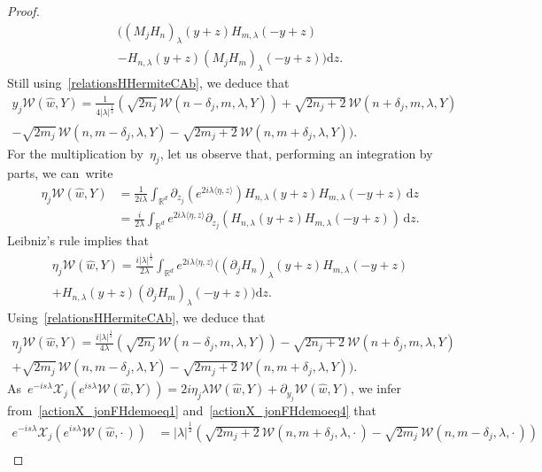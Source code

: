 \documentclass[11pt]{article}
\theoremstyle{definition}
\numberwithin{equation}{section}
\numberwithin{figure}{section}
\numberwithin{table}{section}
\newcommand{\lam}{\lambda}
\newcommand{\wh}{\widehat}
\newcommand*\cW{\mathcal{W}}
\newcommand*\cX{\mathcal{X}}
\newcommand*\R{\mathbb{R}}
\newcommand*{\dd}{\mathrm{d}}
\newcommand{\dz}{\dd z}
\renewcommand*{\cdotp}{.}
\begin{document}
\begin{proof}
\begin{multline*}
\Big((M_jH_n)_\lam (y+z) H_{m,\lam}(-y+z)\\
- H_{n,\lam}(y+z) (M_jH_m)_\lam(-y+z)\Big)\dz.
\end{multline*}
Still using~\eqref{relationsHHermiteCAb}, we deduce that
\begin{multline}\label{actionX_jonFHdemoeq3}
\!\! y_j \cW(\wh w,Y) = \frac 1 {4|\lam|^{\frac 12} } \left(\sqrt {2n_j} \,\cW(n\!-\!\delta_j,m,\lam,Y) \right)\!+\!\sqrt {2n_j\!+\!2}\,\cW(n\!+\!\delta_j,m,\lam,Y) \\
-\sqrt {2m_j}\,\cW(n,m-\delta_j,\lam,Y) -\sqrt {2m_j+2}\,\cW(n,m+\delta_j,\lam,Y)).\!\!
\end{multline}
For the multiplication by~$\eta_j$, let us observe that, performing an integration by parts, we can~write
\[
\begin{aligned}
\eta_j\cW(\wh w,Y) & = \frac 1 {2i\lam} \int_{\R^d} \partial_{z_j} \left(e^{2i\lam\langle \eta,z\rangle} \right) H_{n,\lam} (y+z) H_{m,\lam}(-y+z)\, \dz\\
& = \frac i {2\lam} \int_{\R^d} e^{2i\lam\langle \eta,z\rangle}\partial_{z_j} \left(H_{n,\lam} (y+z) H_{m,\lam}(-y+z) \right)\,\dz.
\end{aligned}
\]
Leibniz's rule implies that
\begin{multline*}
\eta_j\cW(\wh w,Y) = \frac {i|\lam|^{\frac 12}} {2\lam} \int_{\R^d} e^{2i\lam\langle \eta,z\rangle} \Big((\partial_jH_{n})_\lam (y+z) H_{m,\lam}(-y+z) \\
+ H_{n,\lam} (y+z) (\partial_j H_m)_\lam (-y+z) \Big)\dz.
\end{multline*}
Using~\eqref{relationsHHermiteCAb}, we deduce that
\begin{multline}\label{actionX_jonFHdemoeq4}
\!\!\eta_j \cW(\wh w,Y) = \frac {i |\lam|^{\frac 12} } {4\lam} (\sqrt {2n_j} \,\cW(n\!-\!\delta_j,m,\lam,Y)) -\sqrt {2n_j\!+\!2}\, \cW(n\!+\!\delta_j,m,\lam,Y) \\
+\sqrt {2m_j}\,\cW(n,m-\delta_j,\lam,Y) -\sqrt {2m_j+2}\,\cW(n,m+\delta_j,\lam,Y))\cdotp\!\!
\end{multline}
As~$e^{-is\lam} \cX_j\left(e^{is\lam}\cW(\wh w,Y) \right) = 2i\eta_j \lam\cW(\wh w,Y) +\partial_{y_j} \cW(\wh w,Y)$, we infer from~\eqref{actionX_jonFHdemoeq1} and~\eqref{actionX_jonFHdemoeq4} that
\[
\begin{aligned}
e^{-is\lam} \cX_j\left(e^{is\lam}\cW(\wh w,{\cdot\,}) \right) &\! =\! |\lam|^{\frac 12} \left(\sqrt {2m_j\!+\!2}\,\cW(n,m\!+\!\delta_j,\lam,{\cdot\,})-\sqrt {2m_j}\,\cW(n,m\!-\!\delta_j,\lam,{\cdot\,})\right)\\

\end{aligned}\]
\end{proof}
\end{document}
